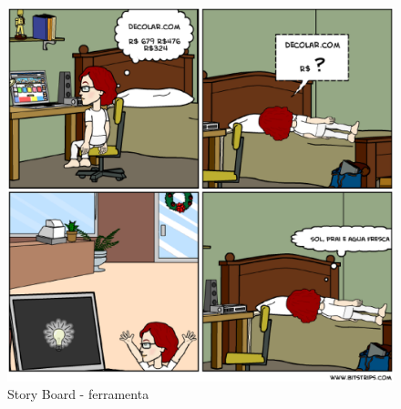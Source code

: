 \begin{figure}[h]
	\centering
	\label{fig02}
		\includegraphics[keepaspectratio=true,scale=0.5]{figuras/ferramenta.eps}
		\caption{Story Board - ferramenta}
\end{figure}


